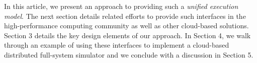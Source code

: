 \documentclass{sig-alternate}
\begin{document}
%

In this article, we present an approach to providing such a {\it unified execution
model}.  The next section details related efforts to provide such
interfaces in the high-performance computing community as well as other
cloud-based solutions.  Section 3 details the key design elements of our
approach.
In Section 4, we walk through an example of using these interfaces to 
implement a cloud-based distributed full-system simulator and we conclude
with a discussion in Section 5.



\end{document}
